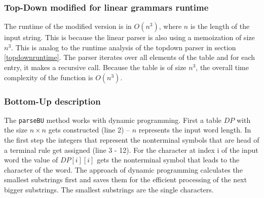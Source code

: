 \documentclass[a4paper, 11pt]{article}
\begin{document}
\subsubsection{Top-Down modified for linear grammars runtime}
\label{lineartopdown_runtime}

The runtime of the modified version is in $O(n^3)$, where $n$ is the length of the input string. This is because the linear parser is also using a memoization of size $n^3$. This is analog to the runtime analysis of the topdown parser in section \ref{topdownruntime}.
The parser iterates over all elements of the table and for each entry, it makes a recursive call. Because the table is of size $n^3$, the overall time complexity of the function is $O(n^3)$.





\subsubsection{Bottom-Up description}
\label{bottomupdescription}

The \texttt{parseBU} method works with dynamic programming.
First a table $DP$ with the size $n \times n$ gets constructed (line 2) -- $n$ represents the input word length.
In the first step the integers that represent the nonterminal symbols that are head of a terminal rule get assigned (line 3 - 12). For the character at index i of the input word the value of $DP[i][i]$ gets the nonterminal symbol that leads to the character of the word.
The approach of dynamic programming calculates the smallest substrings first and saves them for the efficient processing of the next bigger substrings.  The smallest substrings are the single characters.
\end{document}
